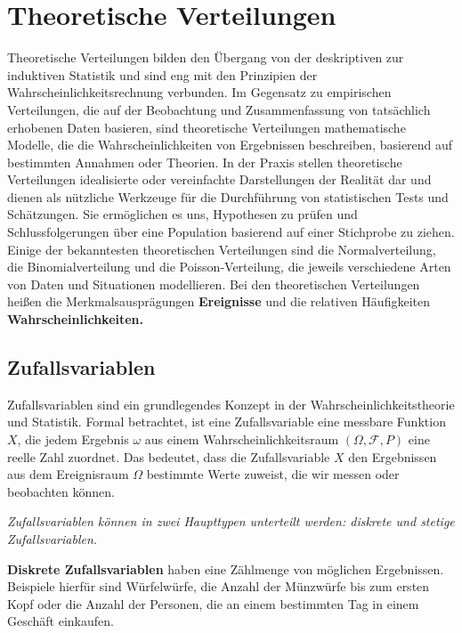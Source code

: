 \chapter{Theoretische Verteilungen}
Theoretische Verteilungen bilden den Übergang von der deskriptiven zur induktiven Statistik und sind eng mit den Prinzipien der Wahrscheinlichkeitsrechnung verbunden.
Im Gegensatz zu empirischen Verteilungen, die auf der Beobachtung und Zusammenfassung von tatsächlich erhobenen Daten basieren, sind theoretische Verteilungen mathematische Modelle, die die Wahrscheinlichkeiten von Ergebnissen beschreiben, basierend auf bestimmten Annahmen oder Theorien.
\newline \newline
In der Praxis stellen theoretische Verteilungen idealisierte oder vereinfachte Darstellungen der Realität dar und dienen als nützliche Werkzeuge für die Durchführung von statistischen Tests und Schätzungen.
Sie ermöglichen es uns, Hypothesen zu prüfen und Schlussfolgerungen über eine Population basierend auf einer Stichprobe zu ziehen.
Einige der bekanntesten theoretischen Verteilungen sind die Normalverteilung, die Binomialverteilung und die Poisson-Verteilung, die jeweils verschiedene Arten von Daten und Situationen modellieren.
\newline \newline
Bei den theoretischen Verteilungen heißen die Merkmalsausprägungen \textbf{Ereignisse} und die relativen Häufigkeiten \textbf{Wahrscheinlichkeiten.}


\section{Zufallsvariablen}

Zufallsvariablen sind ein grundlegendes Konzept in der Wahrscheinlichkeitstheorie und Statistik. Formal betrachtet, ist eine Zufallsvariable eine messbare Funktion $X$, die jedem Ergebnis $\omega$ aus einem Wahrscheinlichkeitsraum $(\Omega, \mathcal{F}, P)$ eine reelle Zahl zuordnet. Das bedeutet, dass die Zufallsvariable $X$ den Ergebnissen aus dem Ereignisraum $\Omega$ bestimmte Werte zuweist, die wir messen oder beobachten können.

\textit{Zufallsvariablen können in zwei Haupttypen unterteilt werden: diskrete und stetige Zufallsvariablen.}

\textbf{Diskrete Zufallsvariablen} haben eine Zählmenge von möglichen Ergebnissen. Beispiele hierfür sind Würfelwürfe, die Anzahl der Münzwürfe bis zum ersten Kopf oder die Anzahl der Personen, die an einem bestimmten Tag in einem Geschäft einkaufen.

